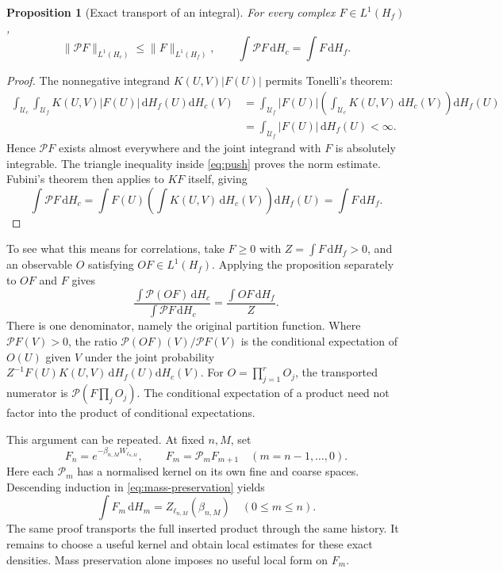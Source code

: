 \documentclass[11pt,reqno]{amsart}
\numberwithin{equation}{section}
\newtheorem{proposition}[theorem]{Proposition}
\theoremstyle{definition}
\theoremstyle{remark}
\newcommand{\dd}{\mathrm d}
\begin{document}
\begin{proposition}[Exact transport of an integral]
\label{prop:transport}
For every complex \(F\in L^1(H_f)\),
\begin{equation}
 \|\mathcal PF\|_{L^1(H_c)}\le\|F\|_{L^1(H_f)},\qquad
 \int\mathcal PF\,\dd H_c=\int F\,\dd H_f.
 \label{eq:mass-preservation}
\end{equation}
\end{proposition}
\begin{proof}
The nonnegative integrand \(K(U,V)|F(U)|\) permits Tonelli's theorem:
\begin{align*}
 \int_{\mathcal U_c}\int_{\mathcal U_f}
              K(U,V)|F(U)|\,\dd H_f(U)\dd H_c(V)
 &=\int_{\mathcal U_f}|F(U)|
            \left(\int_{\mathcal U_c}K(U,V)\,\dd H_c(V)\right)
                                                     \dd H_f(U)\\
 &=\int_{\mathcal U_f}|F(U)|\,\dd H_f(U)<\infty.
\end{align*}
Hence \(\mathcal PF\) exists almost everywhere and the joint
integrand with \(F\) is absolutely integrable. The triangle
inequality inside \eqref{eq:push} proves the norm estimate.
Fubini's theorem then applies to \(KF\) itself, giving
\[
 \int\mathcal PF\,\dd H_c
 =\int F(U)\left(\int K(U,V)\,\dd H_c(V)\right)\dd H_f(U)
 =\int F\,\dd H_f.
\]
\end{proof}

To see what this means for correlations, take \(F\ge0\) with
\(Z=\int F\,\dd H_f>0\), and an observable \(O\) satisfying
\(OF\in L^1(H_f)\). Applying the proposition separately to \(OF\)
and \(F\) gives
\begin{equation}
 \frac{\int\mathcal P(OF)\,\dd H_c}
      {\int\mathcal PF\,\dd H_c}
                  =\frac{\int OF\,\dd H_f}{Z}.
 \label{eq:correlation-preservation}
\end{equation}
There is one denominator, namely the original partition function.
Where \(\mathcal PF(V)>0\), the ratio
\(\mathcal P(OF)(V)/\mathcal PF(V)\) is the conditional expectation
of \(O(U)\) given \(V\) under the joint probability
\(Z^{-1}F(U)K(U,V)\,\dd H_f(U)\dd H_c(V)\).
For \(O=\prod_{j=1}^rO_j\), the transported numerator is
\(\mathcal P(F\prod_jO_j)\). The conditional expectation of a product
need not factor into the product of conditional expectations.

This argument can be repeated. At fixed \(n,M\), set
\[
 F_n=e^{-\beta_{n,M}W_{\ell_{n,M}}},\qquad
 F_m=\mathcal P_mF_{m+1}\quad(m=n-1,\ldots,0).
\]
Here each \(\mathcal P_m\) has a normalised kernel on its own fine
and coarse spaces. Descending induction in
\eqref{eq:mass-preservation} yields
\begin{equation}
          \int F_m\,\dd H_m
             =Z_{\ell_{n,M}}(\beta_{n,M})\quad(0\le m\le n).
 \label{eq:history-mass}
\end{equation}
The same proof transports the full inserted product through the same
history. It remains to choose a useful kernel and obtain local
estimates for these exact densities. Mass preservation alone imposes
no useful local form on \(F_m\).
\end{document}
